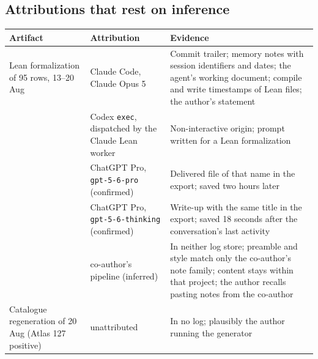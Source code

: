 \documentclass[11pt,a4paper]{article}
\newcommand{\ttt}[1]{\texttt{#1}}
\begin{document}
\subsection{Attributions that rest on inference}

\begin{table}[h]
\centering\small
\begin{tabularx}{\linewidth}{@{}P{3.8cm}P{3.0cm}Y@{}}
\toprule
Artifact & Attribution & Evidence\\ \midrule
Lean formalization of 95 rows, 13--20 Aug & Claude Code, Claude Opus 5 & Commit trailer; memory notes with session identifiers and dates; the agent's working document; compile and write timestamps of Lean files; the author's statement\\
 & Codex \ttt{exec}, dispatched by the Claude Lean worker & Non-interactive origin; prompt written for a Lean formalization\\
 & ChatGPT Pro, \ttt{gpt-5-6-pro} (confirmed) & Delivered file of that name in the export; saved two hours later\\
 & ChatGPT Pro, \ttt{gpt-5-6-thinking} (confirmed) & Write-up with the same title in the export; saved 18 seconds after the conversation's last activity\\
 & co-author's pipeline (inferred) & In neither log store; preamble and style match only the co-author's note family; content stays within that project; the author recalls pasting notes from the co-author\\
Catalogue regeneration of 20 Aug (Atlas 127 positive) & unattributed & In no log; plausibly the author running the generator\\
\bottomrule
\end{tabularx}
\end{table}
\end{document}
